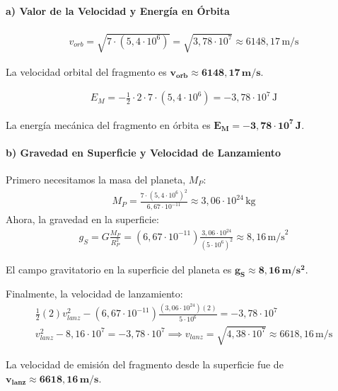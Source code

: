 \paragraph*{a) Valor de la Velocidad y Energía en Órbita}
\begin{gather}
    v_{orb} = \sqrt{7 \cdot (5,4 \cdot 10^6)} = \sqrt{3,78 \cdot 10^7} \approx 6148,17 \, \text{m/s}
\end{gather}
\begin{cajaresultado}
La velocidad orbital del fragmento es $\boldsymbol{v_{orb} \approx 6148,17 \, m/s}$.
\end{cajaresultado}
\begin{gather}
    E_M = -\frac{1}{2} \cdot 2 \cdot 7 \cdot (5,4 \cdot 10^6) = -3,78 \cdot 10^7 \, \text{J}
\end{gather}
\begin{cajaresultado}
La energía mecánica del fragmento en órbita es $\boldsymbol{E_M = -3,78 \cdot 10^7 \, J}$.
\end{cajaresultado}
\paragraph*{b) Gravedad en Superficie y Velocidad de Lanzamiento}
Primero necesitamos la masa del planeta, $M_P$:
\begin{gather}
    M_P = \frac{7 \cdot (5,4 \cdot 10^6)^2}{6,67 \cdot 10^{-11}} \approx 3,06 \cdot 10^{24} \, \text{kg}
\end{gather}
Ahora, la gravedad en la superficie:
\begin{gather}
    g_S = G \frac{M_P}{R_P^2} = (6,67 \cdot 10^{-11}) \frac{3,06 \cdot 10^{24}}{(5 \cdot 10^6)^2} \approx 8,16 \, \text{m/s}^2
\end{gather}
\begin{cajaresultado}
El campo gravitatorio en la superficie del planeta es $\boldsymbol{g_S \approx 8,16 \, m/s^2}$.
\end{cajaresultado}
Finalmente, la velocidad de lanzamiento:
\begin{gather}
    \frac{1}{2} (2) v_{lanz}^2 - (6,67 \cdot 10^{-11}) \frac{(3,06 \cdot 10^{24})(2)}{5 \cdot 10^6} = -3,78 \cdot 10^7 \nonumber \\[8pt]
    v_{lanz}^2 - 8,16 \cdot 10^7 = -3,78 \cdot 10^7 \implies v_{lanz} = \sqrt{4,38 \cdot 10^7} \approx 6618,16 \, \text{m/s}
\end{gather}
\begin{cajaresultado}
La velocidad de emisión del fragmento desde la superficie fue de $\boldsymbol{v_{lanz} \approx 6618,16 \, m/s}$.
\end{cajaresultado}

